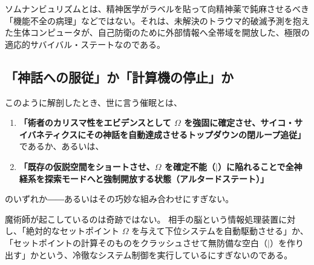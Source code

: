 ソムナンビュリズムとは、精神医学がラベルを貼って向精神薬で鈍麻させるべき「機能不全の病理」などではない。それは、未解決のトラウマ的破滅予測を抱えた生体コンピュータが、自己防衛のために外部情報へ全帯域を開放した、極限の適応的サバイバル・ステートなのである。

\subsection{「神話への服従」か「計算機の停止」か}
このように解剖したとき、世に言う催眠とは、
\begin{enumerate}[label=(\arabic*)]
    \item \textbf{「術者のカリスマ性をエビデンスとして $\Omega$ を強固に確定させ、サイコ・サイバネティクスにその神話を自動達成させるトップダウンの閉ループ追従」}であるか、あるいは、
    \item \textbf{「既存の仮説空間をショートさせ、$\Omega$ を確定不能（$\mid$）に陥れることで全神経系を探索モードへと強制開放する状態（アルタードステート）」}
\end{enumerate}
のいずれか――あるいはその巧妙な組み合わせにすぎない。

魔術師が起こしているのは奇跡ではない。
相手の脳という情報処理装置に対し、「絶対的なセットポイント $\Omega$ を与えて下位システムを自動駆動させる」か、「セットポイントの計算そのものをクラッシュさせて無防備な空白（$\mid$）を作り出す」かという、冷徹なシステム制御を実行しているにすぎないのである。


